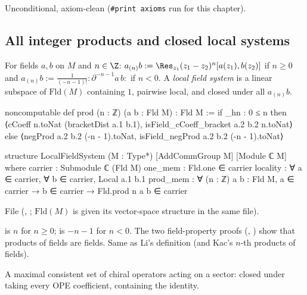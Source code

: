 \begin{status}
Unconditional, axiom-clean (\texttt{\#print axioms}  run for this chapter).
\end{status}

\subsection{All integer products and closed local systems}

\begin{definition}\label{l03:def:lfs}
For fields $a,b$ on $M$ and $n\in\Z$: $a_{(n)}b := \Res_{z_1}(z_1-z_2)^n[a(z_1),b(z_2)]$ if $n\ge0$ and
$a_{(n)}b := \frac1{(-n-1)!}{:}\partial^{-n-1}a\,b{:}$ if $n<0$. A \emph{local field system} is a linear
subspace of $\mathrm{Fld}(M)$ containing $1$, pairwise local, and closed under all $a_{(n)}b$.
\end{definition}
\begin{leancode}
noncomputable def prod (n : ℤ) (a b : Fld M) : Fld M :=
  if _hn : 0 ≤ n then
    ⟨cCoeff n.toNat (bracketDist a.1 b.1), isField_cCoeff_bracket a.2 b.2 n.toNat⟩
  else
    ⟨negProd a.2 b.2 (-n - 1).toNat, isField_negProd a.2 b.2 (-n - 1).toNat⟩

structure LocalFieldSystem (M : Type*) [AddCommGroup M] [Module ℂ M] where
  carrier : Submodule ℂ (Fld M)
  one_mem : Fld.one ∈ carrier
  locality : ∀ a ∈ carrier, ∀ b ∈ carrier, Local a.1 b.1
  prod_mem : ∀ (n : ℤ) {a b : Fld M}, a ∈ carrier → b ∈ carrier → Fld.prod n a b ∈ carrier
\end{leancode}
File  (,
; $\mathrm{Fld}(M)$ is given its vector-space structure in the same file).

\begin{dictionary}
 is $n$ for $n\ge0$;  is $-n-1$ for $n<0$. The two field-property
proofs (, ) show that products of fields are fields.
Same as Li's definition (and Kac's $n$-th products of fields).
\end{dictionary}

\begin{physics}
A maximal consistent set of chiral operators acting on a sector: closed under taking every OPE
coefficient, containing the identity.
\end{physics}

